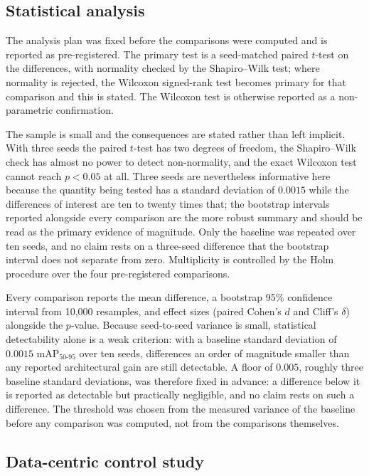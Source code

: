 \subsection{Statistical analysis}
\label{sec:setup:stats}

The analysis plan was fixed before the comparisons were computed and is reported as
pre-registered. The primary test is a seed-matched paired $t$-test on the differences,
with normality checked by the Shapiro--Wilk test; where normality is rejected, the Wilcoxon
signed-rank test becomes primary for that comparison and this is stated. The Wilcoxon test
is otherwise reported as a non-parametric confirmation.

The sample is small and the consequences are stated rather than left implicit. With three
seeds the paired $t$-test has two degrees of freedom, the Shapiro--Wilk check has almost no
power to detect non-normality, and the exact Wilcoxon test cannot reach $p < 0.05$ at all.
Three seeds are nevertheless informative here because the quantity being tested has a
standard deviation of $0.0015$ while the differences of interest are ten to twenty times
that; the bootstrap intervals reported alongside every comparison are the more robust
summary and should be read as the primary evidence of magnitude. Only the baseline was
repeated over ten seeds, and no claim rests on a three-seed difference that the bootstrap
interval does not separate from zero. Multiplicity is controlled by the
Holm procedure over the four pre-registered comparisons.

Every comparison reports the mean difference, a bootstrap 95\% confidence interval from
10{,}000 resamples, and effect sizes (paired Cohen's $d$ and Cliff's $\delta$) alongside
the $p$-value. Because seed-to-seed variance is small, statistical detectability alone is
a weak criterion: with a baseline standard deviation of $0.0015$ mAP$_{50\text{-}95}$ over
ten seeds, differences an order of magnitude smaller than any reported architectural gain
are still detectable. A floor of $0.005$, roughly three baseline standard deviations, was
therefore fixed in advance: a difference below it is reported as detectable but practically
negligible, and no claim rests on such a difference. The threshold was chosen from the
measured variance of the baseline before any comparison was computed, not from the
comparisons themselves.

\subsection{Data-centric control study}
\label{sec:setup:enrichment}

